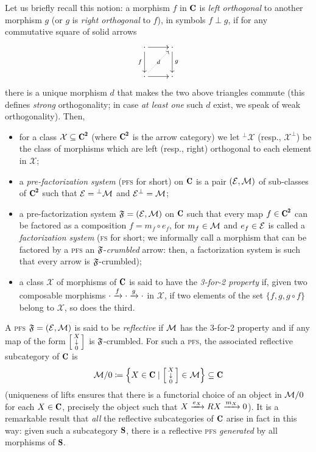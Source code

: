 Let us briefly recall this notion: a morphism $f$ in $\C$ is \emph{left orthogonal} to another morphism $g$ (or $g$ is \emph{right orthogonal} to $f$), in symbols $f\perp g$, if for any commutative square of solid arrows
\[
\xymatrix{
\cdot\ar[r]\ar[d]_f&\cdot\ar[d]^g\\
\cdot\ar[r]\ar@{.>}[ur]|{\ d\ }&\cdot
}
\]
there is a unique morphism $d$ that makes the two above triangles commute (this defines \emph{strong} orthogonality; in case \emph{at least one} such $d$ exist, we speak of weak orthogonality). Then,
\begin{itemize}%
\item for a class $\mathcal X\subseteq \C^\due$ (where $\C^\due$ is the arrow category) we let ${}^{\perp}\mathcal X$ (resp., $\mathcal X^{\perp}$) be the class of morphisms which are left (resp., right) orthogonal to each element in $\mathcal X$;
\item a \emph{pre-factorization system} (\textsc{pfs} for short) on $\C$ is a pair $(\mathcal{E},\mathcal{M})$ of sub-classes of $\C^\due$ such that $\mathcal{E}={}^{\perp}\mathcal{M}$ and $\mathcal{E}^{\perp}=\mathcal{M}$;  
\item a pre-factorization system $\mathfrak{F}=(\mathcal{E},\mathcal{M})$ on $\C$ such that every map $f\in \C^\due$ can be factored as a composition $f=m_f\circ e_f$, for $m_f\in \mathcal{M}$ and $e_f\in \mathcal{E}$ is called a \emph{factorization system} (\textsc{fs} for short; we informally call a morphism that can be factored by a \textsc{pfs} an $\mathfrak{F}$-\emph{crumbled} arrow: then, a factorization system is such that every arrow is $\mathfrak{F}$-crumbled);
\item a class $\mathcal X$ of morphisms of $\C$ is said to have the \emph{3-for-2 property} if, given two composable morphisms $\cdot\xrightarrow{f}\cdot\xrightarrow{g}\cdot$ in $\mathcal X$, if two elements of the set $\{f,g,g\circ f\}$ belong to $\mathcal X$, so does the third.
\end{itemize}
A \textsc{pfs} $\mathfrak{F}=(\mathcal{E},\mathcal{M})$ is said to be \emph{reflective} if $\mathcal{M}$ has the 3-for-2 property and if any map of the form $\left[ \begin{smallmatrix} X \\ \downarrow \\ 0 \end{smallmatrix}\right]$ is $\mathfrak{F}$-crumbled. For such a \textsc{pfs}, the associated reflective subcategory of $\C$ is
\[
\M/0 \coloneqq \left\{X\in \C \mid \var{X}{0}\in \M\right\}\subseteq \C
\]
(uniqueness of lifts ensures that there is a functorial choice of an object in $\mathcal{M}/0$ for each $X\in \C$, precisely the object such that $X \xrightarrow{e_X} RX \xrightarrow{m_X} 0$). It is a remarkable result that \emph{all} the reflective subcategories of $\C$ arise in fact in this way: given such a subcategory $\cate{S}$, there is a reflective \textsc{pfs} \emph{generated} by all morphisms of $\cate{S}$.

